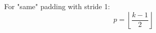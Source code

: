 For "same" padding with stride 1:
\begin{equation}
p = \left\lfloor \frac{k-1}{2} \right\rfloor
\end{equation}


